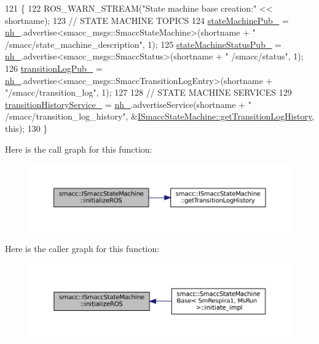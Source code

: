 \begin{DoxyCode}
121 \{
122     ROS\_WARN\_STREAM(\textcolor{stringliteral}{"State machine base creation:"} << shortname);
123     \textcolor{comment}{// STATE MACHINE TOPICS}
124     \hyperlink{classsmacc_1_1ISmaccStateMachine_af4aa9fed70bd4c57b19e3370fbd25de7}{stateMachinePub\_} = \hyperlink{classsmacc_1_1ISmaccStateMachine_ad8877bcca9dbb345fe72cca839c93dd3}{nh\_}.advertise<smacc\_msgs::SmaccStateMachine>(shortname + \textcolor{stringliteral}{"
      /smacc/state\_machine\_description"}, 1);
125     \hyperlink{classsmacc_1_1ISmaccStateMachine_a55a7c7b26ad4dfea441c62c6326a5414}{stateMachineStatusPub\_} = \hyperlink{classsmacc_1_1ISmaccStateMachine_ad8877bcca9dbb345fe72cca839c93dd3}{nh\_}.advertise<smacc\_msgs::SmaccStatus>(shortname + \textcolor{stringliteral}{"
      /smacc/status"}, 1);
126     \hyperlink{classsmacc_1_1ISmaccStateMachine_acc42eb050325c1edc77d81675fb1286a}{transitionLogPub\_} = \hyperlink{classsmacc_1_1ISmaccStateMachine_ad8877bcca9dbb345fe72cca839c93dd3}{nh\_}.advertise<smacc\_msgs::SmaccTransitionLogEntry>(shortname + \textcolor{stringliteral}{
      "/smacc/transition\_log"}, 1);
127 
128     \textcolor{comment}{// STATE MACHINE SERVICES}
129     \hyperlink{classsmacc_1_1ISmaccStateMachine_a73e2a7ca89c3d807eafe5cfb1e86ea05}{transitionHistoryService\_} = \hyperlink{classsmacc_1_1ISmaccStateMachine_ad8877bcca9dbb345fe72cca839c93dd3}{nh\_}.advertiseService(shortname + \textcolor{stringliteral}{"
      /smacc/transition\_log\_history"}, &\hyperlink{classsmacc_1_1ISmaccStateMachine_ae7c08fc2addf8ee4785f721050e6a763}{ISmaccStateMachine::getTransitionLogHistory}, \textcolor{keyword}{
      this});
130 \}
\end{DoxyCode}
Here is the call graph for this function\+:
\nopagebreak
\begin{figure}[H]
\begin{center}
\leavevmode
\includegraphics[width=350pt]{classsmacc_1_1ISmaccStateMachine_a1136dd5d81e846ac86de48bc71912cbf_cgraph}
\end{center}
\end{figure}
Here is the caller graph for this function\+:
\nopagebreak
\begin{figure}[H]
\begin{center}
\leavevmode
\includegraphics[width=350pt]{classsmacc_1_1ISmaccStateMachine_a1136dd5d81e846ac86de48bc71912cbf_icgraph}
\end{center}
\end{figure}

